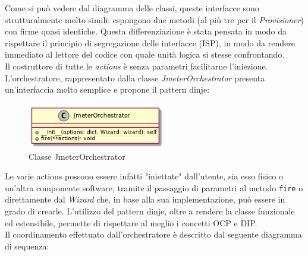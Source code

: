 Come si può vedere dal diagramma delle classi, queste interfacce sono strutturalmente molto simili: espongono due metodi (al più tre per il \textit{Provisioner}) con firme quasi identiche. Questa differenziazione è stata pensata in modo da rispettare il principio di segregazione delle interfacce (ISP), in modo da rendere immediato al lettore del codice con quale unità logica si stesse confrontando.\\
Il costruttore di tutte le \textit{actions} è senza parametri facilitarne l'iniezione. \\
L'orchestratore, rappresentato dalla classe \textit{JmeterOrchestrator} presenta un'interfaccia molto semplice e propone il pattern \gls{dinje}:
\begin{figure}[H]
	\centering
	\includegraphics[width=6cm]{immagini/coreclass}
	\caption{Classe JmeterOrchestrator}
	\label{img-classe-core}
\end{figure}	
Le varie actions possono essere infatti "iniettate" dall'utente, sia esso fisico o un'altra componente software, tramite il passaggio di parametri al metodo \texttt{fire} o direttamente dal \textit{Wizard} che, in base alla sua implementazione, può essere in grado di crearle. L'utilizzo del pattern \gls{dinje}, oltre a rendere la classe funzionale ed estensibile, permette di rispettare al meglio i concetti OCP e DIP.\\
Il coordinamento effettuato dall'orchestratore è descritto dal seguente diagramma di sequenza:
